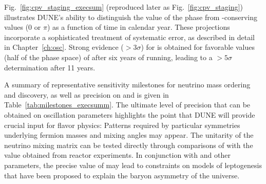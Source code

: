 Fig.~\ref{fig:cpv_staging_execsum} (reproduced later as 
Fig.~\ref{fig:cpv_staging}) illustrates DUNE's ability to distinguish 
the value of the  phase \deltacp from -conserving 
values (0 or $\pi$) as a function of time in calendar year.  
These projections incorporate a sophisticated treatment of systematic 
error, as described in detail in Chapter~\ref{ch:osc}.  Strong evidence ($>3\sigma$) for  is obtained for favorable values (half of the phase space) of \deltacp after six years of running, leading to a $>5\sigma$ determination after 11 years.

A summary of representative sensitivity milestones for neutrino 
mass ordering and  discovery, as well as precision on 
\deltacp and  is given in 
Table~\ref{tab:milestones_execsumm}.  The ultimate level of 
precision that can be obtained on oscillation parameters 
highlights the point that DUNE will provide crucial input for  
flavor physics:  Patterns required by particular symmetries 
underlying fermion masses and mixing angles may appear.  The 
unitarity of the neutrino mixing matrix can be tested directly 
through comparisons of  with the value obtained from 
reactor experiments.  In conjunction with  and 
other parameters, the precise value of \deltacp may lead to 
constraints on models of leptogenesis that have been proposed 
to explain the baryon asymmetry of the universe.

